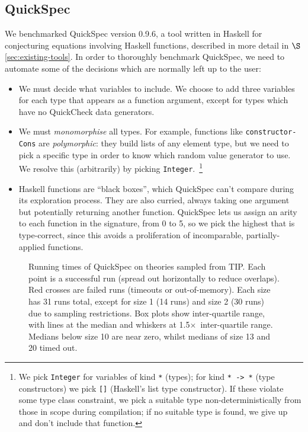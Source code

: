 \subsection{QuickSpec}

We benchmarked QuickSpec version 0.9.6, a tool written in Haskell for
conjecturing equations involving Haskell functions, described in more detail in
$\S$\ref{sec:existing-tools}. In order to thoroughly benchmark QuickSpec, we
need to automate some of the decisions which are normally left up to the user:

\begin{sloppypar}
  \begin{itemize}
  \item We must decide what variables to include. We choose to add three
    variables for each type that appears as a function argument, except for
    types which have no QuickCheck data generators.
  \item We must \emph{monomorphise} all types. For example, functions like
    \texttt{constructor-Cons} are \emph{polymorphic}: they build lists of any
    element type, but we need to pick a specific type in order to know which
    random value generator to use. We resolve this (arbitrarily) by picking
    \texttt{Integer}.~\footnote{We pick \texttt{Integer} for variables of kind
      \texttt{*} (types); for kind \texttt{* -> *} (type constructors) we pick
      \texttt{[]} (Haskell's list type constructor). If these violate some
      type class constraint, we pick a suitable type non-deterministically from
      those in scope during compilation; if no suitable type is found, we give
      up and don't include that function.}
  \item Haskell functions are ``black boxes'', which QuickSpec can't compare
    during its exploration process. They are also curried, always taking one
    argument but potentially returning another function. QuickSpec lets us
    assign an arity to each function in the signature, from 0 to 5, so we pick
    the highest that is type-correct, since this avoids a proliferation of
    incomparable, partially-applied functions.
  \end{itemize}
\end{sloppypar}

\begin{figure}
  \centering
  
  \caption{Running times of QuickSpec on theories sampled from TIP. Each point
    is a successful run (spread out horizontally to reduce overlaps). Red
    crosses are failed runs (timeouts or out-of-memory). Each size has 31 runs
    total, except for size 1 (14 runs) and size 2 (30 runs) due to sampling
    restrictions. Box plots show inter-quartile range, with lines at the median
    and whiskers at 1.5$\times$~inter-quartile range. Medians below size 10 are
    near zero, whilst medians of size 13 and 20 timed out.}
  \label{figure:quickspec_runtimes}
\end{figure}

